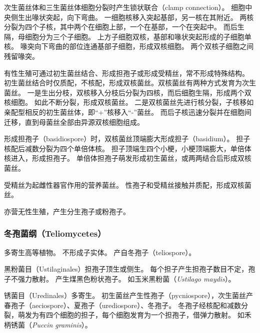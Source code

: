 \documentclass[11pt]{article}
\begin{document}
\newline

次生菌丝体和三生菌丝体细胞分裂时产生锁状联合（clamp connection）。
细胞中央侧生出喙状突起，向下弯曲。
一细胞核移入突起基部，另一核在其附近。
两核分裂为四个子核，其中两个在细胞上部，一个在基部，一个在突起中。
而后生隔，母细胞分为三个子细胞。
上方子细胞双核，基部和喙状突起形成的子细胞单核。
喙突向下弯曲的部位连通基部子细胞，形成双核细胞。
两个双核子细胞之间残留喙突。

\newline

有性生殖可通过初生菌丝结合、形成担孢子或形成受精丝，常不形成特殊结构。
初生菌丝结合时仅质配，不核配，形成双核菌丝。双核菌丝有两种方式发育为次生菌丝。
一是生出分枝，双核移入分枝后分裂为四核，而后细胞生隔，形成两个双核细胞。
如此不断分裂，形成双核菌丝。
二是双核菌丝先进行核分裂，子核移如亲配型相反的初生菌丝体，即“+”核移入“-”菌丝。
而后子核迅速分裂并在细胞间迁移，直到母菌丝全部由异源双核细胞组成。

\newline

形成担孢子（basidiospore）时，双核菌丝顶端膨大形成担子（basidium）。
担子核配后减数分裂为四个单倍体核。
担子顶端生四个小梗，小梗顶端膨大，单倍体核进入，形成担孢子。
单倍体担孢子萌发形成初生菌丝，或两两结合后形成双核菌丝。

\newline

受精丝为起雌性器官作用的营养菌丝。
性孢子和受精丝接触并质配，形成双核菌丝。

\newline

亦营无性生殖，产生分生孢子或粉孢子。

\subsubsection{冬孢菌纲（Teliomycetes）}
多寄生高等植物。
不形成子实体。
产自冬孢子（teliospore）。

\newline

黑粉菌目（Ustilaginales）担孢子顶生或侧生。
每个担子产生担孢子数目不定，孢子不强力散射。
产生煤黑色粉状孢子。
如玉米黑粉菌（\textit{Ustilago maydis}）。

\newline

锈菌目（Uredinales）多寄生。
初生菌丝产生性孢子（pycniospore），次生菌丝产春孢子（aeciospore）、夏孢子（urediospore）、冬孢子。
冬孢子经核配和减数分裂，萌发为有四个细胞的担子，每个细胞发育为一个担孢子，借弹力散射。
如禾柄锈菌（\textit{Puccin graminis}）。
\end{document}
